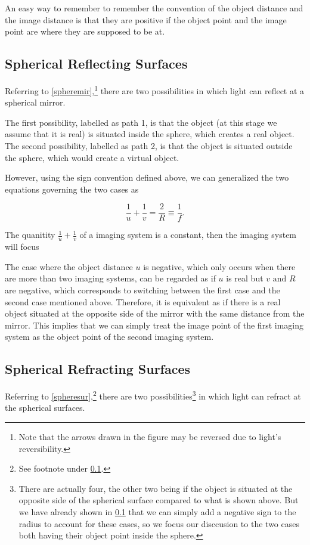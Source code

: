 \documentclass[english,a4paper,12pt]{report}
\begin{document}
An easy way to remember to remember the convention of the object distance and the image distance is that they are positive if the object point and the image point are where they are supposed to be at.

\subsection{Spherical Reflecting Surfaces} \label{spheremirsec} 

Referring to \cref{spheremir},\footnote{Note that the arrows drawn in the figure may be reversed due to light's reversibility.} there are two possibilities in which light can reflect at a spherical mirror.


The first possibility, labelled as path 1, is that the object (at this stage we assume that it is real) is situated inside the sphere, which creates a real object. The second possibility, labelled as path 2, is that the object is situated outside the sphere, which would create a virtual object.

However, using the sign convention defined above, we can generalized the two equations governing the two cases as 

\begin{equation}
    \frac{1}{u} + \frac{1}{v} = \frac{2}{R} \equiv \frac{1}{f}.
\end{equation}

The quanitity \(\frac{1}{u} + \frac{1}{v}\) of a imaging system is a constant, then the imaging system will focus 

The case where the object distance \(u\) is negative, which only occurs when there are more than two imaging systems, can be regarded as if \(u\) is real but \(v \text { and } R\) are negative, which corresponds to switching between the first case and the second case mentioned above. Therefore, it is equivalent as if there is a real object situated at the opposite side of the mirror with the same distance from the mirror. This implies that we can simply treat the image point of the first imaging system as the object point of the second imaging system.

\subsection{Spherical Refracting Surfaces}

Referring to \cref{spheresur},\footnote{See footnote under \cref{spheremirsec}.} there are two possibilities\footnote{There are actually four, the other two being if the object is situated at the opposite side of the spherical surface compared to what is shown above. But we have already shown in \cref{spheremirsec} that we can simply add a negative sign to the radius to account for these cases, so we focus our disccusion to the two cases both having their object point inside the sphere.}  in which light can refract at the spherical surfaces.
\end{document}
